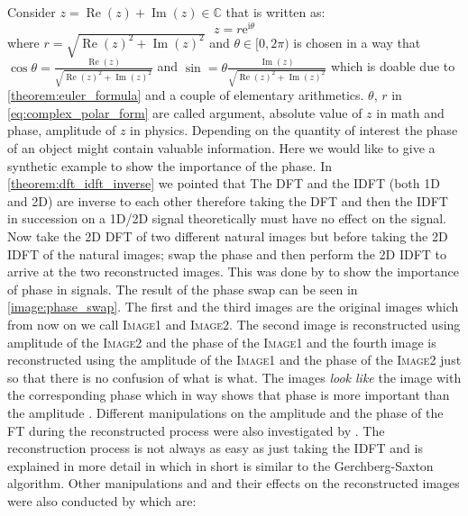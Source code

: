 Consider  $z= \operatorname{Re}(z)+\operatorname{Im}(z) \in \mathbb{C}$ that is written as:
\begin{equation}\label{eq:complex_polar_form}
  z = r \mathrm{e}^ {\mathrm{i}\theta}
\end{equation}
where $r = \sqrt{\operatorname{Re}(z)^2+\operatorname{Im}(z)^2}$ and $\theta \in [0,2\pi)$ is chosen in a way that 
$\cos \theta = \frac{\operatorname{Re}(z)}{\sqrt{\operatorname{Re}(z)^2+\operatorname{Im}(z)^2}}$ and 
$\sin = \theta \frac{\operatorname{Im}(z)}{\sqrt{\operatorname{Re}(z)^2+\operatorname{Im}(z)^2}}$ 
which is doable due to \cref{theorem:euler_formula} and a couple of elementary arithmetics. $\theta$, $r$ in \cref{eq:complex_polar_form} are called 
argument, absolute value of $z$ in math and phase, amplitude of $z$ in physics. Depending on the quantity of interest the phase of an object 
might contain valuable information. Here we would like to give a synthetic example to show the importance of the phase. In \cref{theorem:dft_idft_inverse} 
we pointed that The \ac{DFT} and the \ac{IDFT} (both 1D and 2D) are inverse to each other therefore taking the \ac{DFT} and then the \ac{IDFT} in 
succession on a 1D/2D signal theoretically must have no effect on the signal. Now take the 2D \ac{DFT} of two different natural images but 
before taking the 2D \ac{IDFT} of the natural images; swap the phase and then perform the 2D \ac{IDFT} to arrive at the two reconstructed images. This 
was done by \cite{Oppenheim1981} to show the importance of phase in signals. The result of the phase swap can be seen in \cref{image:phase_swap}. 
The first and the third images are the original images which from now on we call \textsc{Image1} and \textsc{Image2}. 
The second image is reconstructed using amplitude of the \textsc{Image2} and the phase of the \textsc{Image1} and the fourth image is reconstructed using 
the amplitude of the \textsc{Image1} and the phase of the \textsc{Image2} just so that there is no confusion of what is what. The images 
\emph{look like} the image with the corresponding phase which in way shows that phase is more important than the amplitude . Different manipulations 
on the amplitude and the phase of the \ac{FT} during the reconstructed process 
 were also investigated by \cite{Oppenheim1981}. The reconstruction process is not always as easy as just taking the \ac{IDFT} and 
 is explained in more detail in \cite{Oppenheim1979} which in short is similar to the Gerchberg-Saxton algorithm\cite{Gerchberg1972}. 
 Other manipulations and and their effects on the reconstructed images were also conducted by \cite{Oppenheim1981} which are:
